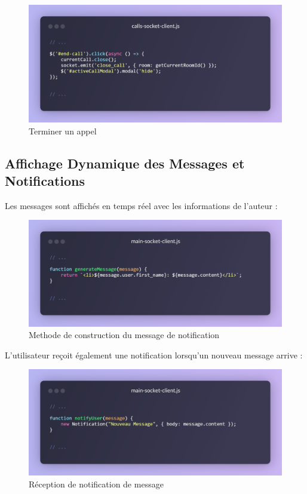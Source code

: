 \begin{figure}[H]
    \centering
    \includegraphics[width=15cm]{assets/annexes/snippet (26).png}
    \caption{ Terminer un appel}
\end{figure}

\subsection*{Affichage Dynamique des Messages et Notifications}

Les messages sont affichés en temps réel avec les informations de l’auteur :

\begin{figure}[H]
    \centering
    \includegraphics[width=15cm]{assets/annexes/snippet (27).png}
    \caption{ Methode de construction du message de notification}
\end{figure}

L’utilisateur reçoit également une notification lorsqu’un nouveau message arrive :

\begin{figure}[H]
    \centering
    \includegraphics[width=15cm]{assets/annexes/snippet (28).png}
    \caption{ Réception de notification de message}
\end{figure}

